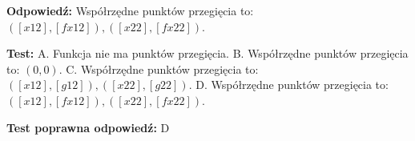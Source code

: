 \documentclass[12pt, a4paper]{article}
\theoremstyle{definition} %
\newcommand{\odpStart}{\noindent \textbf{Odpowiedź:}\newline}    %
\newcommand{\odpStop}{\newline}                                             %
\newcommand{\testStart}{\noindent \textbf{Test:}\newline} %
\newcommand{\testStop}{\newline} %
\newcommand{\kluczStart}{\noindent \textbf{Test poprawna odpowiedź:}\newline} %
\newcommand{\kluczStop}{\newline} %
\begin{document}
\odpStart
Współrzędne punktów przegięcia to: $([x12],[fx12]), ([x22],[fx22])$.
\odpStop

\testStart
A. Funkcja nie ma punktów przegięcia.
B. Współrzędne punktów przegięcia to: $(0,0)$.
C. Współrzędne punktów przegięcia to:  $([x12],[g12]), ([x22],[g22])$.
D. Współrzędne punktów przegięcia to:  $([x12],[fx12]), ([x22],[fx22])$.
\testStop

\kluczStart
D
\kluczStop
\end{document}
